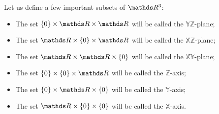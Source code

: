 \begin{df}
	Let us define a few important subsets of $\R^3$:
	\begin{itemize}
		\item The set $\{0\}\times \R\times \R$ will be called the $\mathds{YZ}$-plane;
		\item The set $\R\times\{0\}\times \R$ will be called the $\mathds{XZ}$-plane;
		\item The set $\R\times \R\times \{0\}$ will be called the $\mathds{XY}$-plane;
		\item The set $\{0\}\times\{0\}\times \R$ will be called the $\mathds{Z}$-axis;
		\item The set $\{0\}\times \R\times\{0\}$ will be called the $\mathds{Y}$-axis;
		\item The set $\R\times\{0\}\times \{0\}$ will be called the $\mathds{X}$-axis.
	\end{itemize}
\end{df}
